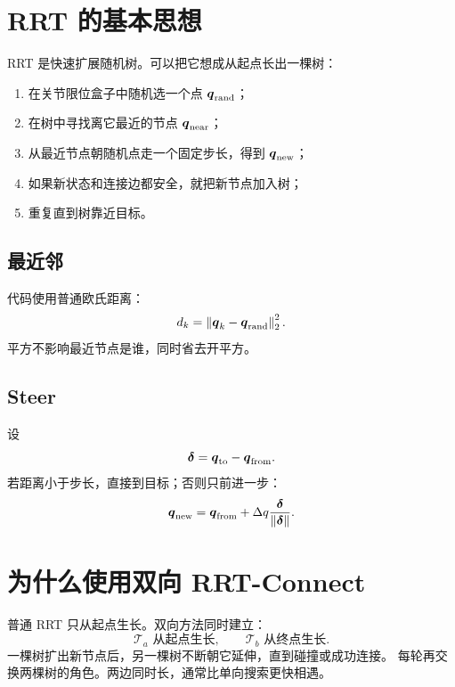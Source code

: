 \section{RRT 的基本思想}

RRT 是快速扩展随机树。可以把它想成从起点长出一棵树：

\begin{enumerate}
  \item 在关节限位盒子中随机选一个点 $\boldsymbol{q}_{\mathrm{rand}}$；
  \item 在树中寻找离它最近的节点 $\boldsymbol{q}_{\mathrm{near}}$；
  \item 从最近节点朝随机点走一个固定步长，得到 $\boldsymbol{q}_{\mathrm{new}}$；
  \item 如果新状态和连接边都安全，就把新节点加入树；
  \item 重复直到树靠近目标。
\end{enumerate}

\subsection{最近邻}

代码使用普通欧氏距离：
\[
d_k=\left\lVert \boldsymbol{q}_k-\boldsymbol{q}_{\mathrm{rand}}\right\rVert_2^2.
\]
平方不影响最近节点是谁，同时省去开平方。

\subsection{Steer}

设
\[
\boldsymbol{\delta}=\boldsymbol{q}_{\mathrm{to}}-\boldsymbol{q}_{\mathrm{from}}.
\]
若距离小于步长，直接到目标；否则只前进一步：
\[
\boldsymbol{q}_{\mathrm{new}}=
\boldsymbol{q}_{\mathrm{from}}+
\Delta q\frac{\boldsymbol{\delta}}{\left\lVert \boldsymbol{\delta}\right\rVert}.
\]

\section{为什么使用双向 RRT-Connect}

普通 RRT 只从起点生长。双向方法同时建立：
\[
\mathcal{T}_a\text{ 从起点生长},\qquad
\mathcal{T}_b\text{ 从终点生长}.
\]
一棵树扩出新节点后，另一棵树不断朝它延伸，直到碰撞或成功连接。
每轮再交换两棵树的角色。两边同时长，通常比单向搜索更快相遇。

